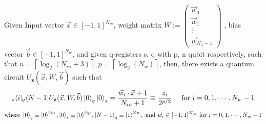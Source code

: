 \begin{lemma}
Given Input vector \( \vec{x} \in [-1, 1]^{N_{in}} \), weight matrix \( W:= \begin{pmatrix}
    \vec{w}_0 \\ \vec{w}_1 \\ \vdots \\ \vec{w}_{N_w - 1}
\end{pmatrix} \) , bias vector \( \vec{b} \in [-1, 1]^{N_w} \), and given q-registers s, q with p, n qubit respectively, such that \( n = \left\lceil \log_2(N_{in} + 3) \right\rceil, p = \left\lceil \log_2(N_w) \right\rceil \), then, there exists a quantum circuit \( U_{\mathbf z}(\vec{x}, W, \vec{b}) \) such that 
\[
    {}_{s}\langle{i}| {}_{q}\langle N-1|U_{\mathbf z}(\vec{x}, W, \vec{b})\ket{0}_q \ket{0}_s = {\vec{w}_i \cdot {\vec{x} + 1} \over {N_{in} + 1}} \equiv {z_i \over {{2^{p/2}}}} \quad \text{ for } i = 0, 1, \cdots , N_{w} - 1
\]
\begin{gather*}
    \text{where } \ket{0}_q \equiv \ket{0}^{\otimes n}, \ket{0}_s \equiv \ket{0}^{\otimes p}, \ket{N-1}_q \equiv \ket{1}^{\otimes n},\text{ and } \vec{w}_i \in [-1, 1]^{N_{in}} \text{ for } i = 0, 1, \cdots, N_w - 1
\end{gather*}

\end{lemma}

